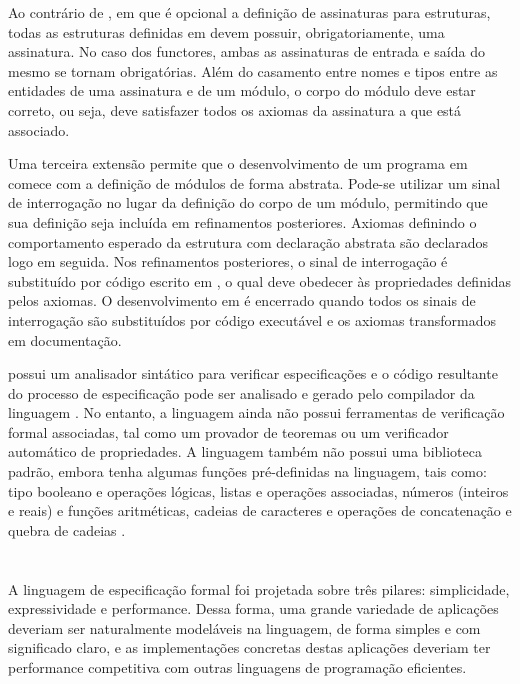 Ao contrário de \SML, em que é opcional a definição de assinaturas para estruturas, todas as estruturas definidas em \EML devem possuir, obrigatoriamente, uma assinatura.
No caso dos functores, ambas as assinaturas de entrada e saída do mesmo se tornam obrigatórias.
Além do casamento entre nomes e tipos entre as entidades de uma assinatura e de um módulo, o corpo do módulo deve estar correto, ou seja, deve satisfazer todos os axiomas da assinatura a que está associado.

Uma terceira extensão permite que o desenvolvimento de um programa em \EML comece com a definição de módulos de forma abstrata.
Pode-se utilizar um sinal de interrogação no lugar da definição do corpo de um módulo, permitindo que sua definição seja incluída em refinamentos posteriores.
Axiomas definindo o comportamento esperado da estrutura com declaração abstrata são declarados logo em seguida.
Nos refinamentos posteriores, o sinal de interrogação é substituído por código escrito em \SML, o qual deve obedecer às propriedades definidas pelos axiomas.
O desenvolvimento em \EML é encerrado quando todos os sinais de interrogação são substituídos por código \SML executável e os axiomas transformados em documentação.

\EML possui um analisador sintático para verificar especificações e o código \SML resultante do processo de especificação pode ser analisado e gerado pelo compilador da linguagem \SML.
No entanto, a linguagem ainda não possui ferramentas de verificação formal associadas, tal como um provador de teoremas ou um verificador automático de propriedades.
A linguagem também não possui uma biblioteca padrão, embora tenha algumas funções pré-definidas na linguagem, tais como: tipo booleano e operações lógicas, listas e operações associadas, números (inteiros e reais) e funções aritméticas, cadeias de caracteres e operações de concatenação e quebra de cadeias \cite{MLDef}.

\section{\Maude}\label{chap:revisaobib:maude}

A linguagem de especificação formal \Maude \cite{MaudeBook} foi projetada sobre três pilares: simplicidade, expressividade e performance.
Dessa forma, uma grande variedade de aplicações deveriam ser naturalmente modeláveis na linguagem, de forma simples e com significado claro, e as implementações concretas destas aplicações deveriam ter performance competitiva com outras linguagens de programação eficientes.

